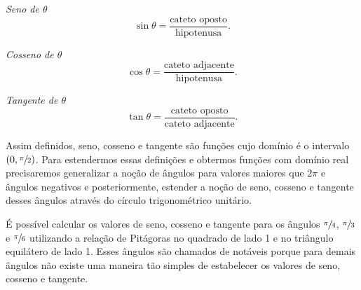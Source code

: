 \emph{Seno de $\theta$}
\[
  \sin\theta=\frac{\text{cateto oposto}}{\text{hipotenusa}}.
\]

\emph{Cosseno de $\theta$}
\[
  \cos\theta=\frac{\text{cateto adjacente}}{\text{hipotenusa}}.
\]

\emph{Tangente de $\theta$}
\[
  \tan\theta=\frac{\text{cateto oposto}}{\text{cateto adjacente}}.
\]

Assim definidos, seno, cosseno e tangente são funções cujo domínio é o
intervalo \(\left(0, \sfrac{\pi}{2}\right)\).
Para estendermos essas definições e obtermos funções com
domínio real precisaremos generalizar a noção de ângulos para valores maiores
que $2\pi$ e ângulos negativos e posteriormente, estender a noção de seno,
cosseno e tangente desses ângulos através do círculo trigonométrico unitário.

\begin{observation}
  É possível calcular os valores de seno, cosseno e tangente para os ângulos
  \(\sfrac{\pi}{4}\),
  \(\sfrac{\pi}{3}\) e
  \(\sfrac{\pi}{6}\)
  utilizando a relação de Pitágoras no quadrado de
  lado 1 e no triângulo equilátero de lado 1. Esses ângulos são chamados de
  notáveis porque para demais ângulos não existe uma maneira tão simples de
  estabelecer os valores de seno, cosseno e tangente.
\end{observation}

